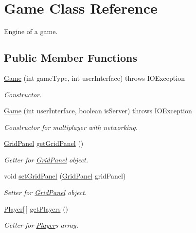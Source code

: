 \hypertarget{classGame}{}\section{Game Class Reference}
\label{classGame}


Engine of a game.  


\subsection*{Public Member Functions}
\begin{DoxyCompactItemize}
\item 
\hyperlink{classGame_ae0ca81a868814b02a8267768494527b2}{Game} (int game\+Type, int user\+Interface)  throws I\+O\+Exception 
\begin{DoxyCompactList}\small\item\em Constructor. \end{DoxyCompactList}\item 
\hyperlink{classGame_af7ee3d5189c58ed74d0cb7783ce64632}{Game} (int user\+Interface, boolean is\+Server)  throws I\+O\+Exception 
\begin{DoxyCompactList}\small\item\em Constructor for multiplayer with networking. \end{DoxyCompactList}\item 
\hyperlink{classGridPanel}{Grid\+Panel} \hyperlink{classGame_af4e648c25a25b73a4cd6fb97688a58ec}{get\+Grid\+Panel} ()
\begin{DoxyCompactList}\small\item\em Getter for \hyperlink{classGridPanel}{Grid\+Panel} object. \end{DoxyCompactList}\item 
void \hyperlink{classGame_a8bbad9db1c17da8848ff253aae44f69c}{set\+Grid\+Panel} (\hyperlink{classGridPanel}{Grid\+Panel} grid\+Panel)
\begin{DoxyCompactList}\small\item\em Setter for \hyperlink{classGridPanel}{Grid\+Panel} object. \end{DoxyCompactList}\item 
\hyperlink{classPlayer}{Player}\mbox{[}$\,$\mbox{]} \hyperlink{classGame_a506ae8e369b87240b4c93e6da86d5cee}{get\+Players} ()
\begin{DoxyCompactList}\small\item\em Getter for \hyperlink{classPlayer}{Player}\textquotesingle{}s array. \end{DoxyCompactList}\item 

\end{DoxyCompactItemize}
